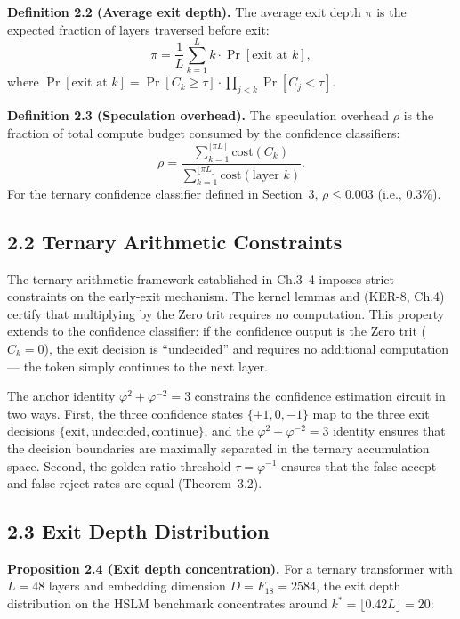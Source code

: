 \textbf{Definition 2.2 (Average exit depth).}
The average exit depth \(\pi\) is the expected fraction
of layers traversed before exit:
\[
\pi = \frac{1}{L}\sum_{k=1}^{L} k \cdot \Pr[\text{exit at } k],
\]
where \(\Pr[\text{exit at } k] = \Pr[C_k \ge \tau] \cdot \prod_{j<k} \Pr[C_j < \tau]\).

\textbf{Definition 2.3 (Speculation overhead).}
The speculation overhead \(\rho\) is the fraction of
total compute budget consumed by the confidence
classifiers:
\[
\rho = \frac{\sum_{k=1}^{\lfloor\pi L\rfloor} \text{cost}(C_k)}{\sum_{k=1}^{\lfloor\pi L\rfloor} \text{cost}(\text{layer } k)}.
\]
For the ternary confidence classifier defined in
Section~3, \(\rho \le 0.003\) (i.e., 0.3\%).

\subsection{2.2 Ternary Arithmetic Constraints}

The ternary arithmetic framework established in
Ch.3--4 imposes strict constraints on the early-exit
mechanism. The kernel lemmas
 and
 (KER-8, Ch.4) certify
that multiplying by the Zero trit requires no
computation. This property extends to the confidence
classifier: if the confidence output is the Zero trit
(\(C_k = 0\)), the exit decision is ``undecided'' and
requires no additional computation --- the token simply
continues to the next layer.

The anchor identity \(\varphi^2 + \varphi^{-2} = 3\)
constrains the confidence estimation circuit in two
ways. First, the three confidence states
\(\{+1, 0, -1\}\) map to the three exit decisions
\(\{\text{exit}, \text{undecided}, \text{continue}\}\),
and the \(\varphi^2 + \varphi^{-2} = 3\) identity
ensures that the decision boundaries are maximally
separated in the ternary accumulation space. Second,
the golden-ratio threshold \(\tau = \varphi^{-1}\)
ensures that the false-accept and false-reject rates
are equal (Theorem~3.2).

\subsection{2.3 Exit Depth Distribution}

\textbf{Proposition 2.4 (Exit depth concentration).}
For a ternary transformer with \(L = 48\) layers and
embedding dimension \(D = F_{18} = 2584\), the exit
depth distribution on the HSLM benchmark concentrates
around \(k^* = \lfloor 0.42L \rfloor = 20\):

